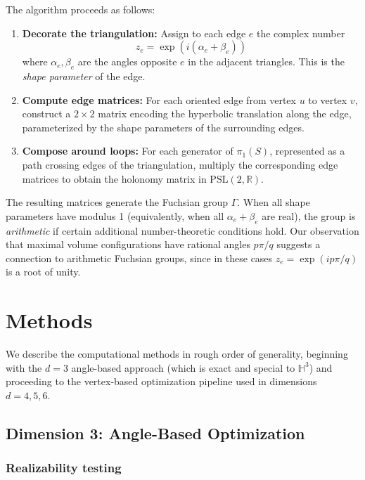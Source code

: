 \documentclass[11pt]{article}
\begin{document}
The algorithm proceeds as follows:
\begin{enumerate}[label=(\roman*)]
    \item \textbf{Decorate the triangulation:} Assign to each edge $e$ the complex number
    \[
    z_e = \exp(i(\alpha_e + \beta_e))
    \]
    where $\alpha_e, \beta_e$ are the angles opposite $e$ in the adjacent triangles. This is the \emph{shape parameter} of the edge.

    \item \textbf{Compute edge matrices:} For each oriented edge from vertex $u$ to vertex $v$, construct a $2 \times 2$ matrix encoding the hyperbolic translation along the edge, parameterized by the shape parameters of the surrounding edges.

    \item \textbf{Compose around loops:} For each generator of $\pi_1(S)$, represented as a path crossing edges of the triangulation, multiply the corresponding edge matrices to obtain the holonomy matrix in $\mathrm{PSL}(2,\mathbb{R})$.
\end{enumerate}

The resulting matrices generate the Fuchsian group $\Gamma$. When all shape parameters have modulus 1 (equivalently, when all $\alpha_e + \beta_e$ are real), the group is \emph{arithmetic} if certain additional number-theoretic conditions hold. Our observation that maximal volume configurations have rational angles $p\pi/q$ suggests a connection to arithmetic Fuchsian groups, since in these cases $z_e = \exp(ip\pi/q)$ is a root of unity.

\section{Methods}
\label{sec:methods}

We describe the computational methods in rough order of generality,
beginning with the $d = 3$ angle-based approach (which is exact
and special to $\mathbb{H}^3$) and proceeding to the vertex-based
optimization pipeline used in dimensions $d = 4, 5, 6$.

\subsection{Dimension 3: Angle-Based Optimization}

\subsubsection{Realizability testing}
\end{document}
